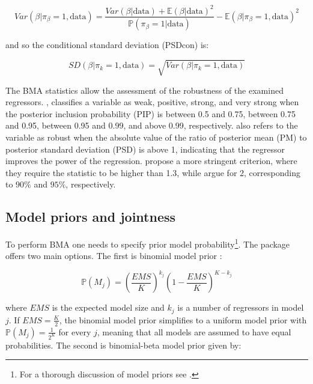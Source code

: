 \documentclass[a4paper]{article}
\begin{document}
\begin{equation}
    Var(\beta|\pi_{\beta}=1,\text{data})=\frac{Var(\beta|\text{data})+\mathbb{E}(\beta|\text{data})^2}{\mathbb{P}(\pi_{\beta}=1|\text{data})}-\mathbb{E}(\beta|\pi_{\beta}=1,\text{data})^2
\end{equation}

\noindent and so the conditional standard deviation (PSDcon) is:

\begin{equation}
SD(\beta | \pi_{k}=1,\text{data}) = \sqrt{ Var(\beta | \pi_{k}=1,\text{data}) }
\end{equation}

\indent The BMA statistics allow the assessment of the robustness of the examined regressors.
\citet{Raftery+1995}, classifies a variable as weak, positive, strong, and very strong when the posterior inclusion probability (PIP) is between 0.5 and 0.75, between 0.75 and 0.95, between 0.95 and 0.99, and above 0.99, respectively.
\citet{Raftery+1995} also refers to the variable as robust when the absolute value of the ratio of posterior mean (PM) to posterior standard deviation (PSD) is above 1, indicating that the regressor improves the power of the regression.
\citet{Masanjala+2008} propose a more stringent criterion, where they require the statistic to be higher than 1.3, while \citet{Sala+2004} argue for 2, corresponding to $90\%$ and $95\%$, respectively.

\subsection{Model priors and jointness}\label{prior_joint}
\noindent To perform BMA one needs to specify prior model probability\footnote{For a thorough discussion of model priors see \citet{Sala+2004,Ley+2009,George+2010,Eicher+2011}.}.
The package offers two main options.
The first is binomial model prior \citep{Sala+2004}:

\begin{equation}
    \mathbb{P}(M_{j})=(\frac{EMS}{K})^{k_{j}}(1-\frac{EMS}{K})^{K-k_{j}}
\end{equation}

where $EMS$ is the expected model size and $k_{j}$ is a number of regressors in model $j$.
If $EMS = \frac{K}{2}$, the binomial model prior simplifies to a uniform model prior with $\mathbb{P}(M_{j}) = \frac{1}{2^K}$ for every $j$, meaning that all models are assumed to have equal probabilities.
The second is binomial-beta model prior \citet{Ley+2009} given by:
\end{document}
